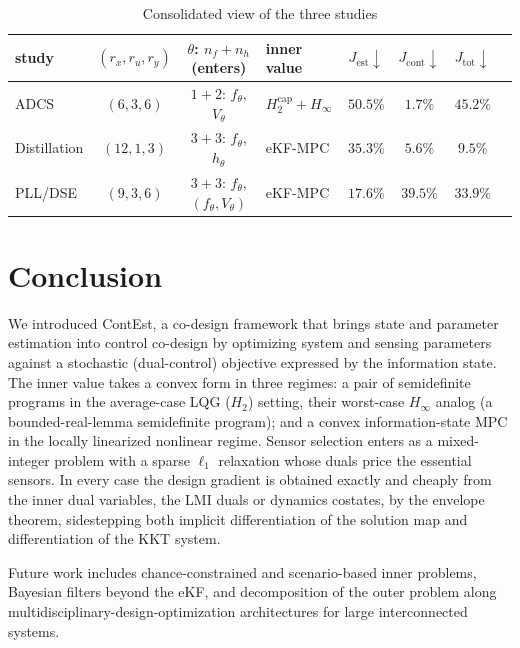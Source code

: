 \documentclass[twocolumn,amsthm]{autart}
\begin{document}
\begin{table}[t]
\centering
\caption{Consolidated view of the three studies}
\label{tab:formulations}
\begin{tabular}{lcclcccc}
\hline
study & $(r_x,r_u,r_y)$ & $\theta$: $n_f{+}n_h$ (enters) & inner value
& $J_{\mathrm{est}}\!\downarrow$ & $J_{\mathrm{cont}}\!\downarrow$ & $J_{\mathrm{tot}}\!\downarrow$\\
\hline
ADCS & $(6,3,6)$   & $1{+}2$: $f_\theta$, $V_\theta$ & $H_2^{\mathrm{cap}} + H_\infty$ & $50.5\%$ & $1.7\%$  & $\mathbf{45.2\%}$\\
Distillation      & $(12,1,3)$  & $3{+}3$: $f_\theta$, $h_\theta$ & eKF-MPC & $35.3\%$ & $5.6\%$  & $\mathbf{9.5\%}$\\
PLL/DSE    & $(9,3,6)$   & $3{+}3$: $f_\theta$, $(f_\theta,V_\theta)$ & eKF-MPC & $17.6\%$ & $39.5\%$ & $\mathbf{33.9\%}$\\
\hline
\end{tabular}
\end{table}

\section{Conclusion}\label{sec:conclusion}

We introduced ContEst, a co-design framework that brings state and parameter
estimation into control co-design by optimizing system and sensing parameters against a stochastic (dual-control) objective
expressed by the information state. The inner value takes a convex form in
three regimes: a pair of semidefinite programs in the average-case LQG ($H_2$)
setting, their worst-case $H_\infty$ analog (a bounded-real-lemma semidefinite program); and a convex information-state MPC
in the locally linearized nonlinear regime. Sensor selection enters as a
mixed-integer problem with a sparse $\ell_1$ relaxation whose duals price the
essential sensors. In every case the design gradient is obtained exactly and cheaply
from the inner dual variables, the LMI duals or dynamics costates, by the envelope
theorem, sidestepping both implicit differentiation of the solution map and
differentiation of the KKT system.

Future work includes chance-constrained and scenario-based inner problems, Bayesian filters beyond the eKF, and decomposition of the outer problem
along multidisciplinary-design-optimization architectures for large interconnected
systems.
\end{document}
